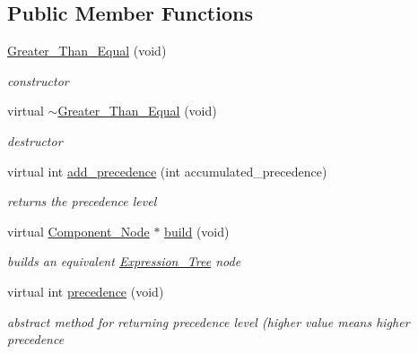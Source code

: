 \subsection*{Public Member Functions}
\begin{DoxyCompactItemize}
\item 
\hyperlink{classMadara_1_1Expression__Tree_1_1Greater__Than__Equal_a179cefcf956a1f53be58ffeff2dd5ad4}{Greater\_\-Than\_\-Equal} (void)
\begin{DoxyCompactList}\small\item\em constructor \item\end{DoxyCompactList}\item 
virtual \hyperlink{classMadara_1_1Expression__Tree_1_1Greater__Than__Equal_a66439f721200c8bfbaf774077f6c59fd}{$\sim$Greater\_\-Than\_\-Equal} (void)
\begin{DoxyCompactList}\small\item\em destructor \item\end{DoxyCompactList}\item 
virtual int \hyperlink{classMadara_1_1Expression__Tree_1_1Greater__Than__Equal_a7a220157018243113057bd293ef72f61}{add\_\-precedence} (int accumulated\_\-precedence)
\begin{DoxyCompactList}\small\item\em returns the precedence level \item\end{DoxyCompactList}\item 
virtual \hyperlink{classMadara_1_1Expression__Tree_1_1Component__Node}{Component\_\-Node} $\ast$ \hyperlink{classMadara_1_1Expression__Tree_1_1Greater__Than__Equal_ad59f6d84a2cca9cdb9da0ca75987f3a4}{build} (void)
\begin{DoxyCompactList}\small\item\em builds an equivalent \hyperlink{classMadara_1_1Expression__Tree_1_1Expression__Tree}{Expression\_\-Tree} node \item\end{DoxyCompactList}\item 
virtual int \hyperlink{classMadara_1_1Expression__Tree_1_1Symbol_ac060dedb8d16864591b259df375109b3}{precedence} (void)
\begin{DoxyCompactList}\small\item\em abstract method for returning precedence level (higher value means higher precedence \item\end{DoxyCompactList}\end{DoxyCompactItemize}
